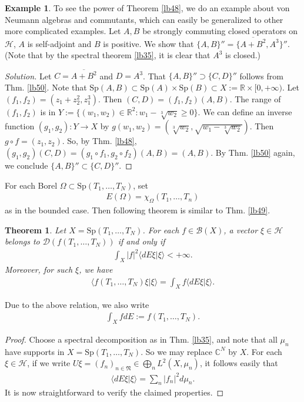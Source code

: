 \documentclass[12pt,b5paper,notitlepage]{article}
\theoremstyle{definition}
\newtheorem{eg}[df]{Example}
\theoremstyle{plain}
\newtheorem{thm}[df]{Theorem}
\newcommand{\fk}{\mathfrak}
\newcommand{\mc}{\mathcal}
\newcommand{\ovl}{\overline}
\newcommand{\Dom}{\scr D}
\newcommand{\bk}[1]{\langle {#1}\rangle}
\newcommand{\scr}{\mathscr}
\newcommand{\mbb}{\mathbb}
\newcommand{\Cbb}{\mathbb C}
\newcommand{\Rbb}{\mathbb R}
\newcommand{\Sp}{\mathrm{Sp}}
\numberwithin{equation}{section}
\begin{document}
\begin{eg}
To see the power of Theorem \ref{lb48}, we do an example about von Neumann algebras and commutants, which can easily be generalized to other more complicated examples. Let $A,B$ be strongly commuting closed operators on $\mc H$, $A$ is self-adjoint and $B$ is positive. We show that $\{A,B\}''=\{\ovl{A+B^2},A^3\}''$. (Note that by the spectral theorem \ref{lb35}, it is clear that $A^3$ is closed.)
\end{eg}
\begin{proof}[Solution]
Let $C=\ovl{A+B^2}$ and $D=A^3$. That $\{A,B\}''\supset\{C,D\}''$ follows from Thm. \ref{lb50}. Note that $\Sp(A,B)\subset \Sp(A)\times\Sp(B)\subset X:=\mbb R\times[0,+\infty)$. Let $(f_1,f_2)=(z_1+z_2^2,z_1^3)$. Then $(C,D)=(f_1,f_2)(A,B)$. The range of $(f_1,f_2)$ is in $Y:=\{(w_1,w_2)\in\Rbb^2:w_1-\sqrt[3]{w_2}\geq 0\}$. We can define an inverse function $(g_1,g_2):Y\rightarrow X$ by $g(w_1,w_2)=(\sqrt[3]{w_2},\sqrt{w_1-\sqrt[3]{w_2}})$. Then $g\circ f=(z_1,z_2)$. So, by Thm. \ref{lb48}, $(g_1,g_2)(C,D)=(g_1\circ f_1,g_2\circ f_2)(A,B)=(A,B)$. By Thm. \ref{lb50} again, we conclude $\{A,B\}''\subset\{C,D\}''$.
\end{proof}



For each Borel $\Omega\subset\Sp(T_1,\dots,T_N)$, set
\begin{align}
	E(\Omega)=\chi_\Omega(T_1,\dots,T_n)
\end{align}
as in the bounded case. Then following theorem is similar to Thm. \ref{lb49}.

\begin{thm}
Let $X=\Sp(T_1,\dots,T_N)$. For each $f\in\scr B(X)$, a vector $\xi\in\mc H$ belongs to $\Dom(f(T_1,\dots,T_N))$ if and only if
\begin{align*}
\int_X |f|^2\bk{dE\xi|\xi}<+\infty.	
\end{align*}
Moreover, for such $\xi$, we have
\begin{align}
\bk{f(T_1,\dots,T_N)\xi|\xi}=\int_X f\bk{dE\xi|\xi}.
\end{align}
\end{thm}

Due to the above relation, we also write
\begin{align}
\int_Xf dE:=f(T_1,\dots,T_N).	
\end{align}


\begin{proof}
Choose a spectral decomposition as in Thm. \ref{lb35}, and note that all $\mu_n$ have supports in $X=\Sp(T_1,\dots,T_N)$. So we may replace $\Cbb^N$ by $X$. For each $\xi\in\mc H$, if we write $U\xi=(f_n)_{n\in\fk N}\in\bigoplus_n L^2(X,\mu_n)$, it follows easily that
\begin{align}
\bk{dE\xi|\xi}=\sum_n |f_n|^2d\mu_n.
\end{align}
It is now straightforward to verify the claimed properties.
\end{proof}
\end{document}
